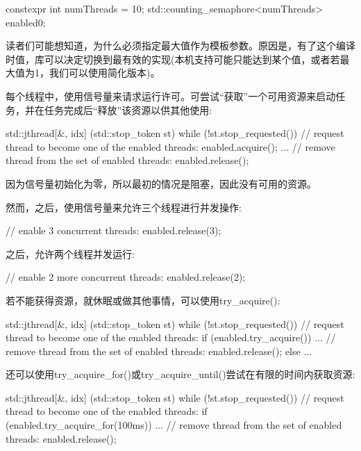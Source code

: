 \begin{cpp}
constexpr int numThreads = 10;
std::counting_semaphore<numThreads> enabled{0};
\end{cpp}

读者们可能想知道，为什么必须指定最大值作为模板参数。原因是，有了这个编译时值，库可以决定切换到最有效的实现(本机支持可能只能达到某个值，或者若最大值为1，我们可以使用简化版本)。

每个线程中，使用信号量来请求运行许可。可尝试“获取”一个可用资源来启动任务，并在任务完成后“释放”该资源以供其他使用:

\begin{cpp}
std::jthread{[&, idx] (std::stop_token st) {
				while (!st.stop_requested()) {
					// request thread to become one of the enabled threads:
					enabled.acquire();
					...
					// remove thread from the set of enabled threads:
					enabled.release();
				}
		}}
\end{cpp}

因为信号量初始化为零，所以最初的情况是阻塞，因此没有可用的资源。

然而，之后，使用信号量来允许三个线程进行并发操作:

\begin{cpp}
// enable 3 concurrent threads:
enabled.release(3);
\end{cpp}

之后，允许两个线程并发运行:

\begin{cpp}
// enable 2 more concurrent threads:
enabled.release(2);
\end{cpp}

若不能获得资源，就休眠或做其他事情，可以使用try\_acquire():

\begin{cpp}
std::jthread{[&, idx] (std::stop_token st) {
				while (!st.stop_requested()) {
					// request thread to become one of the enabled threads:
					if (enabled.try_acquire()) {
						...
						// remove thread from the set of enabled threads:
						enabled.release();
					}
					else {
						...
					}
				}
		}}
\end{cpp}

还可以使用try\_acquire\_for()或try\_acquire\_until()尝试在有限的时间内获取资源:

\begin{cpp}
std::jthread{[&, idx] (std::stop_token st) {
		while (!st.stop_requested()) {
			// request thread to become one of the enabled threads:
			if (enabled.try_acquire_for(100ms)) {
				...
				// remove thread from the set of enabled threads:
				enabled.release();
				}
			}
		}}
\end{cpp}

